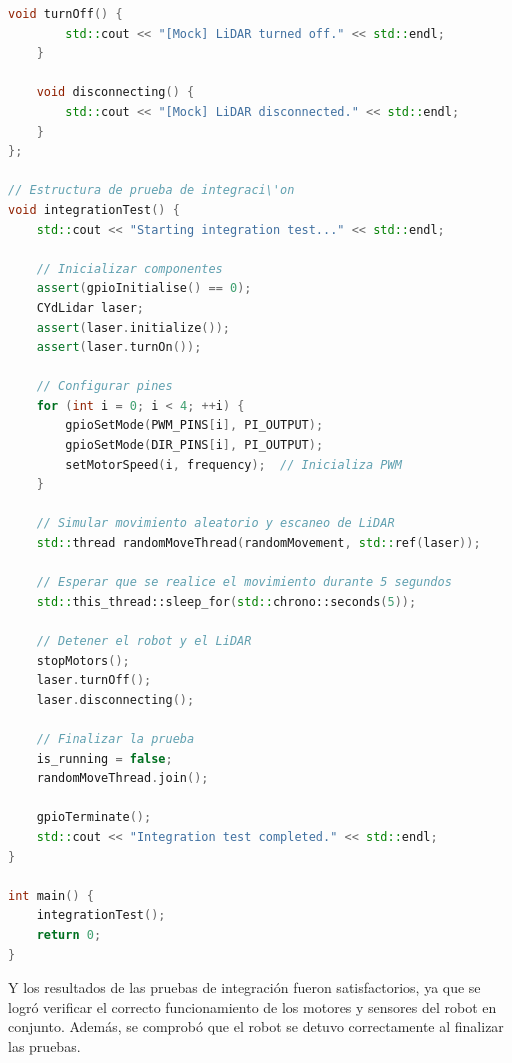\begin{lstlisting}[language={C++}, caption={main.cpp}, label={Script}]
    void turnOff() {
        std::cout << "[Mock] LiDAR turned off." << std::endl;
    }

    void disconnecting() {
        std::cout << "[Mock] LiDAR disconnected." << std::endl;
    }
};

// Estructura de prueba de integraci\'on
void integrationTest() {
    std::cout << "Starting integration test..." << std::endl;

    // Inicializar componentes
    assert(gpioInitialise() == 0);
    CYdLidar laser;
    assert(laser.initialize());
    assert(laser.turnOn());

    // Configurar pines
    for (int i = 0; i < 4; ++i) {
        gpioSetMode(PWM_PINS[i], PI_OUTPUT);
        gpioSetMode(DIR_PINS[i], PI_OUTPUT);
        setMotorSpeed(i, frequency);  // Inicializa PWM
    }

    // Simular movimiento aleatorio y escaneo de LiDAR
    std::thread randomMoveThread(randomMovement, std::ref(laser));
    
    // Esperar que se realice el movimiento durante 5 segundos
    std::this_thread::sleep_for(std::chrono::seconds(5));
    
    // Detener el robot y el LiDAR
    stopMotors();
    laser.turnOff();
    laser.disconnecting();

    // Finalizar la prueba
    is_running = false;
    randomMoveThread.join();

    gpioTerminate();
    std::cout << "Integration test completed." << std::endl;
}

int main() {
    integrationTest();
    return 0;
}
        \end{lstlisting}
        \vskip 0.5cm
        Y los resultados de las pruebas de integraci\'on fueron satisfactorios, ya que se logr\'o verificar el correcto funcionamiento de los motores y sensores 
        del robot en conjunto. Adem\'as, se comprob\'o que el robot se detuvo correctamente al finalizar las pruebas.
        \vskip 0.5cm
